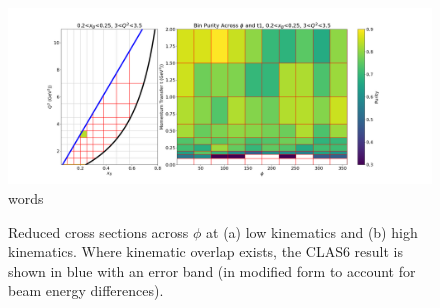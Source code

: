     
    \begin{figure}[ht]
    \centering
    \includegraphics[trim={0 0 0 0},clip,width=\textwidth]{Chapters/Ch5-Further/0_IBU/pics/complete/testfig.png}
    \caption[words]{words}
    \label{fig:ibu5}
    \end{figure}
    
    
    \begin{figure}[H]
        \centering
        \hfill
        
        \caption[Reduced Cross Sections Across $\phi$]{Reduced cross sections across $\phi$ at (a) low kinematics and (b) high kinematics. Where kinematic overlap exists, the CLAS6 result \parencite{Bedlinskiy2014ExclusiveCLAS} is shown in blue with an error band (in modified form to account for beam energy differences). }\label{fig:mig_ex}
    \end{figure}
    
